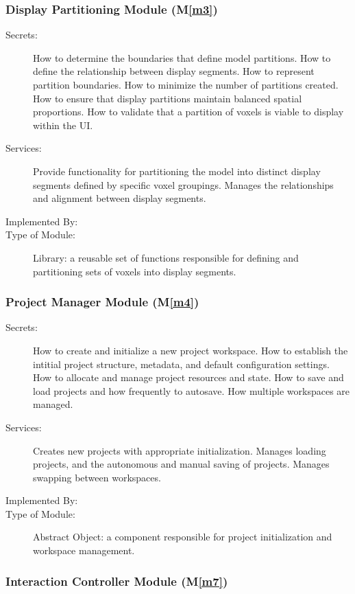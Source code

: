 \documentclass[12pt, titlepage]{article}
\newcommand{\mref}[1]{M\ref{#1}}
\begin{document}
\subsubsection{Display Partitioning Module (\mref{m3})}

\begin{description}
  \item[Secrets:] How to determine the boundaries that define model partitions. How to define the relationship
  between display segments. How to represent partition boundaries. How to minimize the number of partitions created. How to ensure that display partitions maintain balanced spatial proportions. How to validate that a partition of voxels is viable to display within the UI.
  \item[Services:] Provide functionality for partitioning the model into distinct display segments defined by specific voxel groupings. Manages the relationships and alignment between display segments.
  \item[Implemented By:] \progname{}
  \item[Type of Module:] Library: a reusable set of functions responsible for defining and partitioning sets of voxels into display segments.
\end{description}

\subsubsection{Project Manager Module (\mref{m4})}

\begin{description}
\item[Secrets:] How to create and initialize a new project workspace. How to establish the intitial project structure, metadata, and default configuration settings. How to allocate and manage project resources and state. How to save and load projects and how frequently to autosave. How multiple workspaces are managed.
\item[Services:] Creates new projects with appropriate initialization. Manages loading projects, and the autonomous and manual saving of projects. Manages swapping between workspaces.
\item[Implemented By:] \progname{}
\item[Type of Module:] Abstract Object: a component responsible for project initialization and workspace management.
\end{description} 

\subsubsection{Interaction Controller Module (\mref{m7})}
\end{document}
